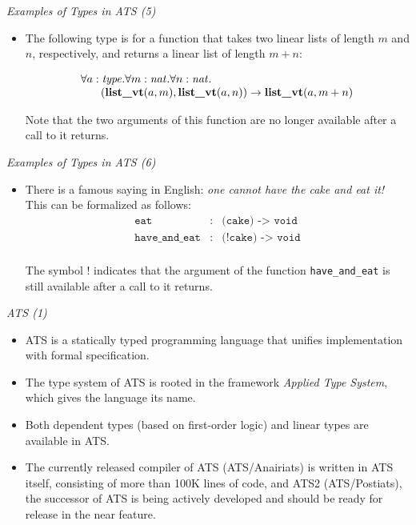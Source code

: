 \documentclass[pdf]{prosper}
\def\snat{{\it nat}}
\def\stype{{\it type}}
\def\tllist{\mbox{\bf list\_vt}}
\def\timp{\rightarrow}
\begin{document}
\begin{slide}{\em Examples of Types in ATS (5)}
\begin{itemize}
\item

The following type is for a function that takes two linear lists of length
$m$ and $n$, respectively, and returns a linear list of length $m+n$:

$$\begin{array}{l}
\forall a:\stype.\forall m:\snat.\forall n:\snat.~\\
\kern18pt(\tllist(a, m), \tllist(a, n)) \timp \tllist(a, m+n)\\
\end{array}$$

Note that the two arguments of this function are no longer available
after a call to it returns.

\end{itemize}
\end{slide}
\begin{slide}{\em Examples of Types in ATS (6)}
\begin{itemize}
\item

There is a famous saying in English: {\em one cannot have the cake and
eat it!} This can be formalized as follows:
$$\begin{array}{rcl}
\texttt{eat} & : & \texttt{(cake) -> void} \\
\texttt{have\_and\_eat} & : & \texttt{(!cake) -> void} \\
\end{array}$$

The symbol $!$ indicates that the argument of the function
\texttt{have\_and\_eat} is still available after a call to it returns.

\end{itemize}
\end{slide}
\begin{slide}{\em ATS (1)}
\begin{itemize}

\item
ATS is a statically typed programming language that unifies implementation
with formal specification.

\item
The type system of ATS is rooted in the framework {\em Applied Type System},
which gives the language its name.

\item
Both dependent types (based on first-order logic) and linear types are
available in ATS.

\item
The currently released compiler of ATS (ATS/Anairiats) is written in ATS
itself, consisting of more than 100K lines of code, and ATS2
(ATS/Postiats), the successor of ATS is being actively developed and should
be ready for release in the near feature.

\end{itemize}
\end{slide}
\end{document}
